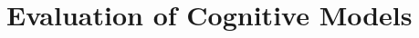 \documentclass[11pt,a4paper,openany]{book}
\begin{document}
\frontmatter\tableofcontents
\mainmatter
\chapter{Evaluation of Cognitive Models}
\end{document}

